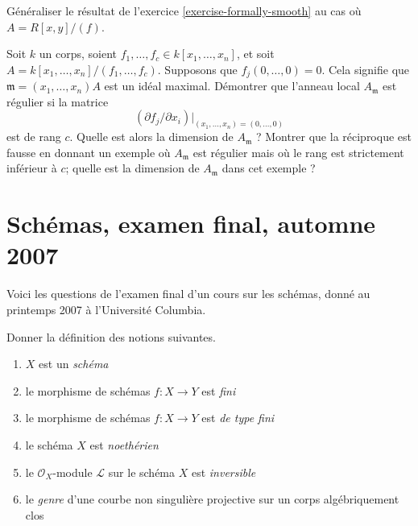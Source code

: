 \begin{exercise}
\label{exercise-formally-smooth-one-equation}
Généraliser le résultat de l'exercice \ref{exercise-formally-smooth}
au cas où $A = R[x, y]/(f)$.
\end{exercise}

\begin{exercise}
\label{exercise-Jacobian-criterion}
Soit $k$ un corps, soient $f_1, \ldots, f_c \in k[x_1, \ldots, x_n]$, et
soit $A = k[x_1, \ldots, x_n]/(f_1, \ldots, f_c)$.
Supposons que $f_j(0, \ldots, 0) = 0$. Cela signifie que
$\mathfrak m = (x_1, \ldots, x_n)A$ est un idéal maximal.
Démontrer que l'anneau local $A_\mathfrak m$ est régulier
si la matrice
$$
(\partial f_j/ \partial x_i)|_{(x_1, \ldots, x_n) = (0, \ldots, 0)}
$$
est de rang $c$. Quelle est alors la dimension de $A_\mathfrak m$ ?
Montrer que la réciproque est fausse en donnant un exemple où
$A_\mathfrak m$ est régulier mais où le rang est strictement inférieur à $c$;
quelle est la dimension de $A_\mathfrak m$ dans cet exemple ?
\end{exercise}




\section{Schémas, examen final, automne 2007}
\label{section-final-exam-fall-2007}

\noindent
Voici les questions de l'examen final d'un cours sur les schémas,
donné au printemps 2007 à l'Université Columbia.

\begin{exercise}[Définitions]
\label{exercise-definitions}
Donner la définition des notions suivantes.
\begin{enumerate}
\item $X$ est un {\it schéma}
\item le morphisme de schémas $f : X \to Y$ est {\it fini}
\item le morphisme de schémas $f : X \to Y$ est {\it de type fini}
\item le schéma $X$ est {\it noethérien}
\item le ${\mathcal O}_X$-module ${\mathcal L}$ sur
le schéma $X$ est {\it inversible}
\item le {\it genre} d'une courbe non singulière
projective sur un corps algébriquement clos
\end{enumerate}
\end{exercise}


